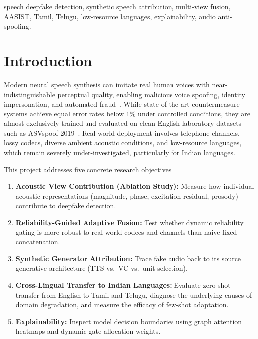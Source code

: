 \documentclass[conference]{IEEEtran}
\begin{document}
\begin{IEEEkeywords}
speech deepfake detection, synthetic speech attribution, multi-view fusion, AASIST, Tamil, Telugu, low-resource languages, explainability, audio anti-spoofing.
\end{IEEEkeywords}

\section{Introduction}
Modern neural speech synthesis can imitate real human voices with near-indistinguishable perceptual quality, enabling malicious voice spoofing, identity impersonation, and automated fraud~\cite{wang2020asvspoof2019,liu2023asvspoof2021}. While state-of-the-art countermeasure systems achieve equal error rates below 1\% under controlled conditions, they are almost exclusively trained and evaluated on clean English laboratory datasets such as ASVspoof 2019~\cite{jung2022aasist,tak2021end}. Real-world deployment involves telephone channels, lossy codecs, diverse ambient acoustic conditions, and low-resource languages, which remain severely under-investigated, particularly for Indian languages.

This project addresses five concrete research objectives:
\begin{enumerate}
    \item \textbf{Acoustic View Contribution (Ablation Study):} Measure how individual acoustic representations (magnitude, phase, excitation residual, prosody) contribute to deepfake detection.
    \item \textbf{Reliability-Guided Adaptive Fusion:} Test whether dynamic reliability gating is more robust to real-world codecs and channels than naive fixed concatenation.
    \item \textbf{Synthetic Generator Attribution:} Trace fake audio back to its source generative architecture (TTS vs.\ VC vs.\ unit selection).
    \item \textbf{Cross-Lingual Transfer to Indian Languages:} Evaluate zero-shot transfer from English to Tamil and Telugu, diagnose the underlying causes of domain degradation, and measure the efficacy of few-shot adaptation.
    \item \textbf{Explainability:} Inspect model decision boundaries using graph attention heatmaps and dynamic gate allocation weights.
\end{enumerate}
\end{document}
